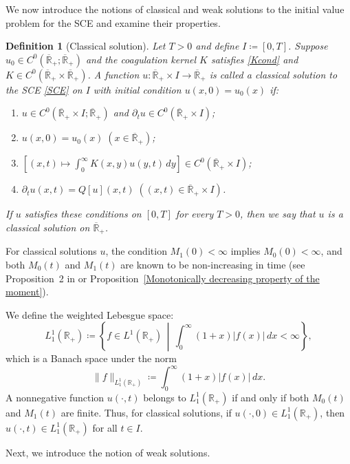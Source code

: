 \documentclass[a4paper,11pt]{article}
\newtheorem{dfn}[thm]{Definition}
\def\Rp{{\mathbb R}_+}
\def\Rb{\overline{{\mathbb R}}_+}
\def\DS{\displaystyle}
\begin{document}
We now introduce the notions of classical and weak solutions to the initial value problem for the SCE and examine their properties.

\begin{dfn}[Classical solution] \label{classicalsolution}
Let $T > 0$ and define $I \coloneqq [0,T]$. Suppose $u_0 \in C^0(\Rb; \Rb)$ and the coagulation kernel $K$ satisfies \eqref{Kcond} and $K \in C^0(\Rb \times \Rb)$. A function $u: \Rb \times I \to \Rb$ is called a classical solution to the SCE \eqref{SCE} on $I$ with initial condition $u(x,0) = u_0(x)$ if:
  \begin{enumerate}[{\rm (C1)}]
    \item $u\in C^0(\Rb \times I;\Rb)$ and $\partial_t u\in C^0(\Rb \times I)$;
    \item $u(x, 0) = u_0(x)\;(x\in \Rb )$;
    \item
      $\DS \left[(x,t)\mapsto \int^\infty_0 K(x,y)u(y,t)\,dy\right]\in C^0(\Rb \times I)$;
    \item $\displaystyle\partial_t u(x,t)=Q[u](x,t)\;((x,t)\in\Rb \times I)$.
  \end{enumerate}
If $u$ satisfies these conditions on $[0,T]$ for every $T > 0$, then we say that $u$ is a classical solution on $\Rb$.
\end{dfn}

For classical solutions $u$, the condition $M_1(0) < \infty$ implies $M_0(0) < \infty$, and both $M_0(t)$ and $M_1(t)$ are known to be non-increasing in time (see Proposition~2 in \cite{I-K-M2023} or Proposition~\ref{Monotonically decreasing property of the moment}).

We define the weighted Lebesgue space:
\[
L^1_1(\Rp) \coloneqq \left\{ f \in L^1(\Rp) \,\middle|\, \int_0^\infty (1+x)|f(x)|\,dx < \infty \right\},
\]
which is a Banach space under the norm
\[
\|f\|_{L^1_1(\Rp)} \coloneqq \int_0^\infty (1+x)|f(x)|\,dx.
\]
A nonnegative function $u(\cdot,t)$ belongs to $L^1_1(\Rp)$ if and only if both $M_0(t)$ and $M_1(t)$ are finite. Thus, for classical solutions, if $u(\cdot,0) \in L^1_1(\Rp)$, then $u(\cdot,t) \in L^1_1(\Rp)$ for all $t \in I$.

Next, we introduce the notion of weak solutions.
\end{document}
